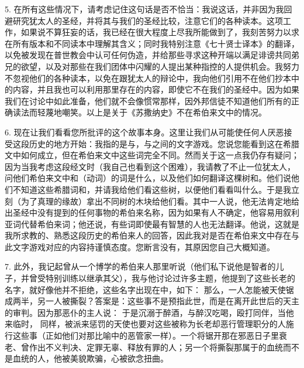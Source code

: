 5. 在所有这些情况下，请考虑记住这句话是否不恰当：我说这话，并非因为我回避研究犹太人的圣经，并将其与我们的圣经比较，注意它们的各种读本。这项工作，如果说不算狂妄的话，我已经在很大程度上尽我所能做到了，我刻苦努力以求在所有版本和不同读本中理解其含义；同时我特别注意《七十贤士译本》的翻译，以免被发现在普世教会中认可任何伪造，并给那些寻求这种开端以满足诽谤共同弟兄的欲望，以及对那些在我们团体中闪耀的人提出某种指控的人提供机会。我努力不忽视他们的各种读本，以免在跟犹太人的辩论中，我向他们引用不在他们抄本中的内容，并且我也可以利用那里存在的内容，即使它不在我们的圣经中。因为如果我们在讨论中如此准备，他们就不会像惯常那样，因外邦信徒不知道他们所有的正确读法而轻蔑地嘲笑。以上是关于《苏撒纳史》不在希伯来文中的情况。\par

6. 现在让我们看看您所批评的这个故事本身。这里让我们从可能使任何人厌恶接受这段历史的地方开始：我指的是与，与之间的文字游戏。您说您能看到这在希腊文中如何成立，但在希伯来文中这些词完全不同。然而关于这一点我仍存有疑问；因为当我考虑这段经文时（我自己也看到这个困难），我请教了不止一位犹太人，问他们希伯来文中和（动词）的词是什么，以及他们如何翻译这棵树和。他们说他们不知道这些希腊词和，并请我给他们看这些树，以便他们看看叫什么。于是我立刻（为了真理的缘故）拿出不同树的木块给他们看。其中一人说，他无法肯定地给出圣经中没有提到的任何事物的希伯来名称，因为如果有人不确定，他容易用叙利亚词代替希伯来词；他还说，有些词即使最有智慧的人也无法翻译。他说，这就是我所求教的、熟悉这段历史的希伯来人的回答，因此我对是否在希伯来文中存在与此文字游戏对应的内容持谨慎态度。您断言没有，其原因您自己大概知道。\par

7. 此外，我记起曾从一个博学的希伯来人那里听说（他们私下说他是智者的儿子，并曾受特别训练以继承其父），我与他讨论过许多主题，他提到了这些长老的名字，就好像他并不拒绝，这些名字出现在中，如下： 那么，一人怎能被天使锯成两半，另一人被撕裂？答案是：这些事不是预指此世，而是在离开此世后的天主的审判。因为那恶仆的主人说： 于是沉溺于醉酒，与醉汉吃喝，殴打同伴，当他来临时， 同样，被派来惩罚的天使也要对这些被称为长老却恶行管理职分的人施行这些事（正如他们对那比喻中的恶管家一样）。一个将锯开那在邪恶日子里衰老、曾作出不义判决、定罪无辜、释放有罪的人；另一个将撕裂那属于的血统而不是血统的人，他被美貌欺骗，心被欲念扭曲。\par

